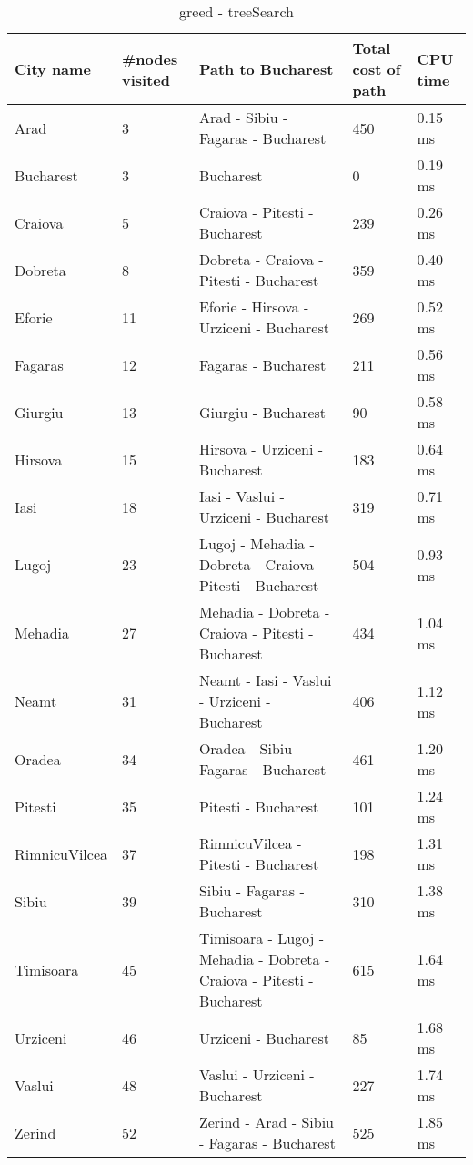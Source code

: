 \documentclass[a4paper]{article}
\begin{document}
\begin {table}[H]
\caption {greed - treeSearch}
\begin{center}
\begin{tabular}{ | l | l |  p{5cm} | l | l |} \hline
City name & \multicolumn{1}{l|}{\#nodes visited} & \multicolumn{1}{l|}{Path to Bucharest} & \multicolumn{1}{l|}{Total cost of path} & \multicolumn{1}{l|}{CPU time} \\ \hline
Arad & 3 & Arad - Sibiu - Fagaras - Bucharest & 450 & 0.15 ms \\ \hline
Bucharest & 3 & Bucharest & 0 & 0.19 ms \\ \hline
Craiova & 5 & Craiova - Pitesti - Bucharest & 239 & 0.26 ms \\ \hline
Dobreta & 8 & Dobreta - Craiova - Pitesti - Bucharest & 359 & 0.40 ms \\ \hline
Eforie & 11 & Eforie - Hirsova - Urziceni - Bucharest & 269 & 0.52 ms \\ \hline
Fagaras & 12 & Fagaras - Bucharest & 211 & 0.56 ms \\ \hline
Giurgiu & 13 & Giurgiu - Bucharest & 90 & 0.58 ms \\ \hline
Hirsova & 15 & Hirsova - Urziceni - Bucharest & 183 & 0.64 ms \\ \hline
Iasi & 18 & Iasi - Vaslui - Urziceni - Bucharest & 319 & 0.71 ms \\ \hline
Lugoj & 23 & Lugoj - Mehadia - Dobreta - Craiova - Pitesti - Bucharest & 504 & 0.93 ms \\ \hline
Mehadia & 27 & Mehadia - Dobreta - Craiova - Pitesti - Bucharest & 434 & 1.04 ms \\ \hline
Neamt & 31 & Neamt - Iasi - Vaslui - Urziceni - Bucharest & 406 & 1.12 ms \\ \hline
Oradea & 34 & Oradea - Sibiu - Fagaras - Bucharest & 461 & 1.20 ms \\ \hline
Pitesti & 35 & Pitesti - Bucharest & 101 & 1.24 ms \\ \hline
RimnicuVilcea & 37 & RimnicuVilcea - Pitesti - Bucharest & 198 & 1.31 ms \\ \hline
Sibiu & 39 & Sibiu - Fagaras - Bucharest & 310 & 1.38 ms \\ \hline
Timisoara & 45 & Timisoara - Lugoj - Mehadia - Dobreta - Craiova - Pitesti - Bucharest & 615 & 1.64 ms \\ \hline
Urziceni & 46 & Urziceni - Bucharest & 85 & 1.68 ms \\ \hline
Vaslui & 48 & Vaslui - Urziceni - Bucharest & 227 & 1.74 ms \\ \hline
Zerind & 52 & Zerind - Arad - Sibiu - Fagaras - Bucharest & 525 & 1.85 ms \\ \hline
\end{tabular}
\end{center}
\end {table}
\end{document}
